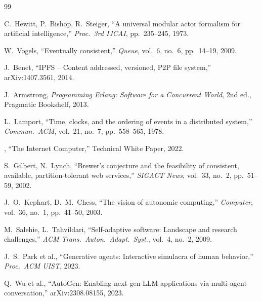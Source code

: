 \documentclass[12pt]{article}
\begin{document}
\begin{thebibliography}{99}

C.~Hewitt, P.~Bishop, R.~Steiger,
``A universal modular actor formalism for artificial intelligence,''
\textit{Proc.\ 3rd IJCAI}, pp.~235--245, 1973.

W.~Vogels,
``Eventually consistent,''
\textit{Queue}, vol.~6, no.~6, pp.~14--19, 2009.

J.~Benet,
``IPFS -- Content addressed, versioned, P2P file system,''
arXiv:1407.3561, 2014.

J.~Armstrong,
\emph{Programming Erlang: Software for a Concurrent World},
2nd ed., Pragmatic Bookshelf, 2013.

L.~Lamport,
``Time, clocks, and the ordering of events in a distributed system,''
\textit{Commun.\ ACM}, vol.~21, no.~7, pp.~558--565, 1978.

,
``The Internet Computer,''
Technical White Paper, 2022.

S.~Gilbert, N.~Lynch,
``Brewer's conjecture and the feasibility of consistent, available,
partition-tolerant web services,''
\textit{SIGACT News}, vol.~33, no.~2, pp.~51--59, 2002.

J.~O.~Kephart, D.~M.~Chess,
``The vision of autonomic computing,''
\textit{Computer}, vol.~36, no.~1, pp.~41--50, 2003.

M.~Salehie, L.~Tahvildari,
``Self-adaptive software: Landscape and research challenges,''
\textit{ACM Trans.\ Auton.\ Adapt.\ Syst.}, vol.~4, no.~2, 2009.

J.~S.~Park et al.,
``Generative agents: Interactive simulacra of human behavior,''
\textit{Proc.\ ACM UIST}, 2023.

Q.~Wu et al.,
``AutoGen: Enabling next-gen LLM applications via multi-agent conversation,''
arXiv:2308.08155, 2023.

\end{thebibliography}
\end{document}
